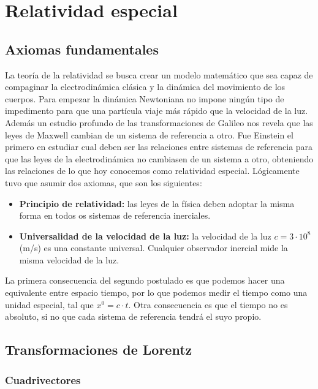 
\chapter*{Relatividad especial}


\section*{Axiomas fundamentales}

La teoría de la relatividad se busca crear un modelo matemático que sea capaz de compaginar la electrodinámica clásica y la dinámica del movimiento de los cuerpos. Para empezar la dinámica Newtoniana no impone ningún tipo de impedimento para que una partícula viaje más rápido que la velocidad de la luz. Además un estudio profundo de las transformaciones de Galileo nos revela que las leyes de Maxwell cambian de un sistema de referencia a otro. Fue Einstein el primero en estudiar cual deben ser las relaciones entre sistemas de referencia para que las leyes de la electrodinámica no cambiasen de un sistema a otro, obteniendo las relaciones de lo que hoy conocemos como relatividad especial. Lógicamente tuvo que asumir dos axiomas, que son los siguientes:

\begin{itemize}
\item \textbf{Principio de relatividad:} las leyes de la física deben adoptar la misma forma en todos os sistemas de referencia inerciales.

\item \textbf{Universalidad de la velocidad de la luz:} la velocidad de la luz $c=3\cdot 10^8$ (m/s) es una constante universal. Cualquier observador inercial mide la misma velocidad de la luz.
\end{itemize}


La primera consecuencia del segundo postulado es que podemos hacer una equivalente entre espacio tiempo, por lo que podemos medir el tiempo como una unidad especial, tal que $x^0=c \cdot t$. Otra consecuencia es que el tiempo no es absoluto, si no que cada sistema de referencia tendrá el suyo propio.

\section*{Transformaciones de Lorentz}
 \subsection*{Cuadrivectores}


